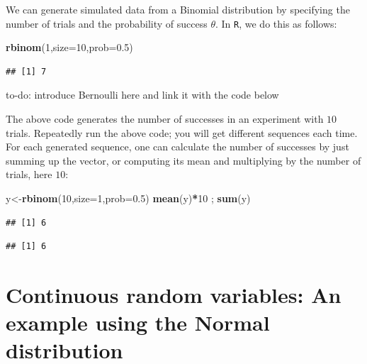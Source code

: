 \documentclass[12pt,]{krantz}
\makeatletter
\newenvironment{Shaded}{\begin{snugshade}}{\end{snugshade}}
\newcommand{\DataTypeTok}[1]{\textcolor[rgb]{0.13,0.29,0.53}{#1}}
\newcommand{\DecValTok}[1]{\textcolor[rgb]{0.00,0.00,0.81}{#1}}
\newcommand{\FloatTok}[1]{\textcolor[rgb]{0.00,0.00,0.81}{#1}}
\newcommand{\KeywordTok}[1]{\textcolor[rgb]{0.13,0.29,0.53}{\textbf{#1}}}
\newcommand{\NormalTok}[1]{#1}
\newcommand{\OperatorTok}[1]{\textcolor[rgb]{0.81,0.36,0.00}{\textbf{#1}}}
\newenvironment{kframe}{%
\medskip{}
\setlength{\fboxsep}{.8em}
 \def\at@end@of@kframe{}%
 \ifinner\ifhmode%
  \def\at@end@of@kframe{\end{minipage}}%
  \begin{minipage}{\columnwidth}%
 \fi\fi%
 \def\FrameCommand##1{\hskip\@totalleftmargin \hskip-\fboxsep
 \colorbox{shadecolor}{##1}\hskip-\fboxsep
     \hskip-\linewidth \hskip-\@totalleftmargin \hskip\columnwidth}%
 \MakeFramed {\advance\hsize-\width
   \@totalleftmargin\z@ \linewidth\hsize
   \@setminipage}}%
 {\par\unskip\endMakeFramed%
 \at@end@of@kframe}
\newenvironment{rmdblock}[1]
  {
  \begin{itemize}
  \renewcommand{\labelitemi}{
    \raisebox{-.7\height}[0pt][0pt]{
      {\setkeys{Gin}{width=3em,keepaspectratio}\texttt{[image: images/\#1]}}
    }
  }
  \setlength{\fboxsep}{1em}
  \begin{kframe}
  \item
  }
  {
  \end{kframe}
  \end{itemize}
  }
\newenvironment{rmdnote}
  {\begin{rmdblock}{note}}
  {\end{rmdblock}}
\theoremstyle{definition}
\theoremstyle{definition}
\theoremstyle{definition}
\theoremstyle{remark}
\makeatother
\begin{document}
We can generate simulated data from a Binomial distribution by specifying the number of trials and the probability of success \(\theta\). In \texttt{R}, we do this as follows:

\begin{Shaded}
\begin{Highlighting}[]
\KeywordTok{rbinom}\NormalTok{(}\DecValTok{1}\NormalTok{,}\DataTypeTok{size=}\DecValTok{10}\NormalTok{,}\DataTypeTok{prob=}\FloatTok{0.5}\NormalTok{)}
\end{Highlighting}
\end{Shaded}

\begin{verbatim}
## [1] 7
\end{verbatim}

\begin{rmdnote}
to-do: introduce Bernoulli here and link it with the code below
\end{rmdnote}

The above code generates the number of successes in an experiment with \(10\) trials. Repeatedly run the above code; you will get different sequences each time. For each generated sequence, one can calculate the number of successes by just summing up the vector, or computing its mean and multiplying by the number of trials, here \(10\):

\begin{Shaded}
\begin{Highlighting}[]
\NormalTok{y<-}\KeywordTok{rbinom}\NormalTok{(}\DecValTok{10}\NormalTok{,}\DataTypeTok{size=}\DecValTok{1}\NormalTok{,}\DataTypeTok{prob=}\FloatTok{0.5}\NormalTok{)}
\KeywordTok{mean}\NormalTok{(y)}\OperatorTok{*}\DecValTok{10}\NormalTok{ ; }\KeywordTok{sum}\NormalTok{(y)}
\end{Highlighting}
\end{Shaded}

\begin{verbatim}
## [1] 6
\end{verbatim}

\begin{verbatim}
## [1] 6
\end{verbatim}

\hypertarget{continuous-random-variables-an-example-using-the-normal-distribution}{%
\section{Continuous random variables: An example using the Normal distribution}\label{continuous-random-variables-an-example-using-the-normal-distribution}}
\end{document}
